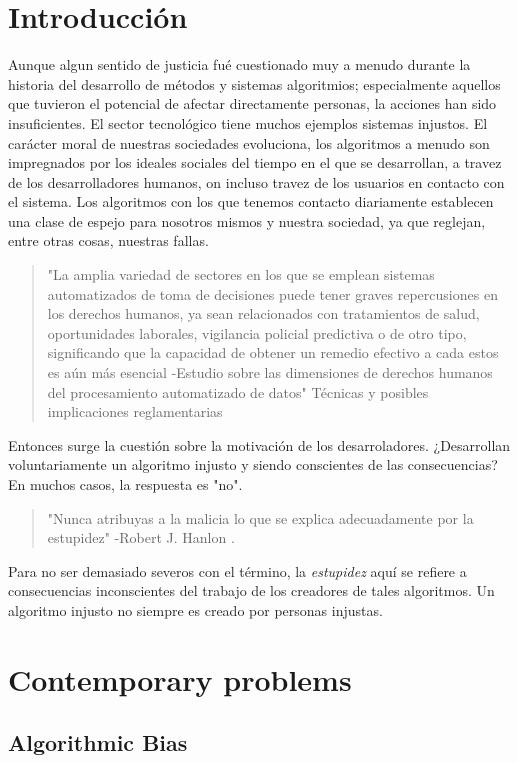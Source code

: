 \section{Introducción}
Aunque algun sentido de justicia fué cuestionado muy a menudo durante la historia del desarrollo de métodos y sistemas algoritmios; especialmente aquellos que tuvieron el potencial de afectar directamente personas\cite{Pehn20}, la acciones han sido insuficientes. El sector tecnológico tiene muchos ejemplos sistemas injustos.
El carácter moral de nuestras sociedades evoluciona, los algoritmos a menudo son impregnados por los ideales sociales del tiempo en el que se desarrollan, a travez de los desarrolladores humanos, on incluso travez de los usuarios en contacto con el sistema. Los algoritmos con los que tenemos contacto diariamente establecen una clase de espejo para nosotros mismos y nuestra sociedad, ya que reglejan, entre otras cosas, nuestras fallas.
\begin{quote}
  "La amplia variedad de sectores en los que se emplean sistemas automatizados de toma de decisiones puede tener graves repercusiones en los derechos humanos, ya sean relacionados con tratamientos de salud, oportunidades laborales, vigilancia policial predictiva o de otro tipo, significando que la capacidad de obtener un remedio efectivo a cada estos es aún más esencial -Estudio sobre las dimensiones de derechos humanos del procesamiento automatizado de datos"
  Técnicas y posibles implicaciones reglamentarias
\end{quote} \cite{CommNaN}

Entonces surge la cuestión sobre la motivación de los desarroladores. ¿Desarrollan voluntariamente un algoritmo injusto y siendo conscientes de las consecuencias? En muchos casos, la respuesta es "no".\cite{OCDK19}
\begin{quote}
  "Nunca atribuyas a la malicia lo que se explica adecuadamente por la estupidez" -Robert J. Hanlon \cite{Bloc81}.
\end{quote}
Para no ser demasiado severos con el término, la \textsl{estupidez} aquí se refiere a consecuencias inconscientes del trabajo de los creadores de tales algoritmos. Un algoritmo injusto no siempre es creado por personas injustas.

\section{Contemporary problems}

\subsection{Algorithmic Bias}
\label{AlgorithmicBias}

